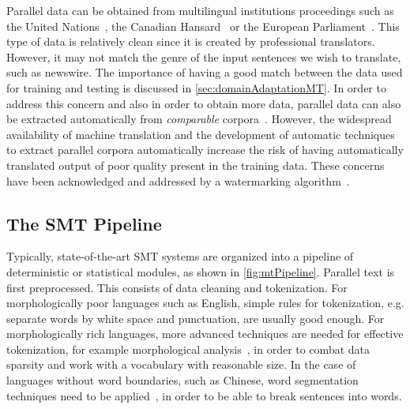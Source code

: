 Parallel data can be obtained from multilingual institutions
proceedings such as the United
Nations~\citep{franz-kumar-brants:2013:LDC},%
the Canadian
Hansard~\citep{germann:2001:WEB} or the
European Parliament~\citep{koehn:2005:MTSummit}.
This type of data is relatively clean since it is created
by professional translators. However, it may not match
the genre of the input sentences we wish to translate, such
as newswire. The importance of having a good match between
the data used for training and testing is discussed
in \autoref{sec:domainAdaptationMT}. In order to address
this concern and also in order to obtain more data, parallel
data can also be extracted automatically from \emph{comparable}
corpora~\citep{smith-saintamand-plamada-koehn-callisonburch-lopez:2013:ACL2013}.
However, the widespread availability of
machine translation and the development of automatic techniques
to extract parallel corpora automatically increase the
risk of having automatically translated output of poor
quality present in the training data. These concerns have
been acknowledged and addressed by a watermarking
algorithm~\citep{venugopal-uszkoreit-talbot-och-ganitkevitch:2011:EMNLP}.

\subsection{The SMT Pipeline}

Typically, state-of-the-art SMT systems are organized into
a pipeline of deterministic or statistical modules, as shown
in \autoref{fig:mtPipeline}.
Parallel text is first preprocessed. This consists of data cleaning
and tokenization.
For morphologically poor languages such as
English, simple rules for tokenization, e.g. separate words by white space
and punctuation, are usually good enough.
For morphologically rich languages, more advanced techniques
are needed for effective tokenization, for example
morphological analysis~\citep{habash-rambow:2005:ACL}, in order
to combat data sparsity and work with a vocabulary with reasonable size.
In the case of languages without word
boundaries, such as Chinese, word segmentation techniques
need to be applied~\citep{zhang-clark:2007:ACL}, in order
to be able to break sentences into words.

